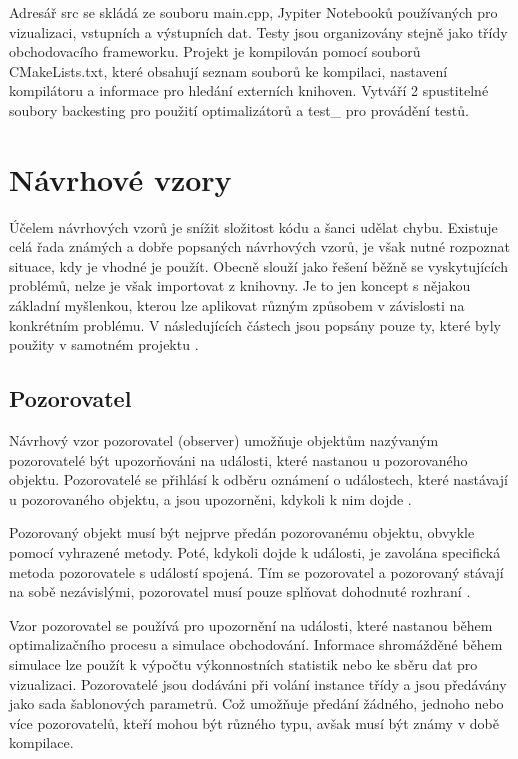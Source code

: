 Adresář src se skládá ze souboru main.cpp, Jypiter Notebooků používaných pro vizualizaci, vstupních a výstupních dat.
Testy jsou organizovány stejně jako třídy obchodovacího frameworku.
Projekt je kompilován pomocí souborů CMakeLists.txt, které obsahují seznam souborů ke kompilaci, nastavení kompilátoru a informace pro hledání externích knihoven.
Vytváří 2 spustitelné soubory backesting pro použití optimalizátorů a test\_ pro provádění testů.

\section{Návrhové vzory}
Účelem návrhových vzorů je snížit složitost kódu a šanci udělat chybu.
Existuje celá řada známých a dobře popsaných návrhových vzorů, je však nutné rozpoznat situace, kdy je vhodné je použít.
Obecně slouží jako řešení běžně se vyskytujících problémů, nelze je však importovat z knihovny.
Je to jen koncept s nějakou základní myšlenkou, kterou lze aplikovat různým způsobem v závislosti na konkrétním problému.
V následujících částech jsou popsány pouze ty, které byly použity v samotném projektu \cite{design-pattern}.

\subsection{Pozorovatel}
Návrhový vzor pozorovatel (observer) umožňuje objektům nazývaným pozorovatelé být upozorňováni na události, které nastanou u pozorovaného objektu.
Pozorovatelé se přihlásí k odběru oznámení o událostech, které nastávají u pozorovaného objektu, a jsou upozorněni, kdykoli k nim dojde \cite{observer}.

Pozorovaný objekt musí být nejprve předán pozorovanému objektu, obvykle pomocí vyhrazené metody.
Poté, kdykoli dojde k události, je zavolána specifická metoda pozorovatele s událostí spojená.
Tím se pozorovatel a pozorovaný stávají na sobě nezávislými, pozorovatel musí pouze splňovat dohodnuté rozhraní \cite{observer}.

Vzor pozorovatel se používá pro upozornění na události, které nastanou během optimalizačního procesu a simulace obchodování.
Informace shromážděné během simulace lze použít k výpočtu výkonnostních statistik nebo ke sběru dat pro vizualizaci.
Pozorovatelé jsou dodáváni při volání instance třídy a jsou předávány jako sada šablonových parametrů.
Což umožňuje předání žádného, jednoho nebo více pozorovatelů, kteří mohou být různého typu, avšak musí být známy v době kompilace.

